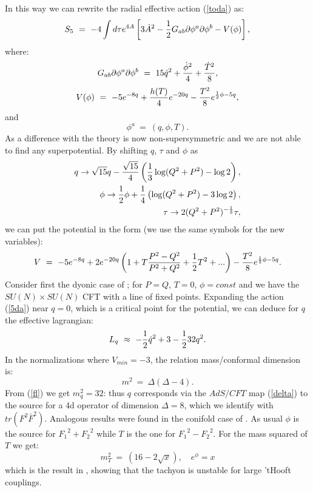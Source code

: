 \documentclass[a4paper,12pt]{article}
\def\half{{1 \over 2}}
\begin{document}
In this way we can rewrite the radial effective action (\ref{toda}) as:
\begin{equation}
S_5~=~-4 \int d\tau e^{4A}\left[3{\dot A}^2 -\half G_{ab}\partial\phi^a\partial\phi^b - V(\phi)\right],
\label{5da}
\end{equation}
where:
\begin{equation}
G_{ab}\partial\phi^a\partial\phi^b~=~15{\dot q}^2 +{{\dot\phi}^2\over4}+{{\dot T}^2\over 8},
\end{equation}
\begin{equation}
V(\phi)~=~-5e^{-8q}+{h(T)\over 4}e^{-20q}- {T^2\over 8}e^{\half \phi -5q},
\end{equation}
and
\begin{equation}
\phi^a~=~(q,\phi,T).
\end{equation}
As a difference with \cite{ktfrac} the theory is now non-supersymmetric and we are not 
able to find any superpotential. By shifting $q$, $\tau$ and $\phi$ as
\begin{eqnarray}
q\rightarrow {\sqrt{15}}q - {{\sqrt{15}}\over4}\left({1\over3}\log(Q^2+P^2) -\log2\right), \nonumber \\
\phi\rightarrow \half\phi + {1\over4}\left(\log(Q^2+P^2) -3\log2\right), \nonumber \\
\tau\rightarrow 2(Q^2+P^2)^{-{1\over3}}\tau ,
\end{eqnarray}
we can put the potential in the form (we use the same symbols for the 
new variables):
\begin{equation}
V~=~ -5e^{-8q} + 2e^{-20q}\left( 1+ T {{P^2-Q^2}\over P^2 + Q^2} + \half T^2 + ...\right)
- {T^2\over 8}e^{\half \phi -5q}.
\end{equation}
Consider first the dyonic case of \cite{kt1}; for $P=Q$, $T=0$, $\phi=const$ and we have
the $SU(N)\times SU(N)$ CFT with a line of fixed points.
Expanding the action (\ref{5da}) near $q=0$, which is a critical point for the potential,  we can deduce for $q$ the effective lagrangian:
\begin{equation}
L_{q}~\approx~ -\half{\dot q}^2 +3 -{\half 32}{q}^2.
\label{fl}
\end{equation}
In the normalizations where $V_{min}=-3$, the relation mass/conformal dimension is:
\begin{equation}
m^2~=~\Delta(\Delta - 4).
\label{delta}
\end{equation}
From (\ref{fl}) we get $m_{q}^2=32$: thus $q$ corresponds via the $AdS/CFT$ map (\ref{delta}) to the source for a 4d operator of dimension $\Delta=8$, which we 
identify with $tr(F^2\bar F^2)$. Analogous results were found in the conifold case of \cite{bgz}.
As usual \cite{k} $\phi$ is the source for ${F_1}^2 + {F_2}^2$ while $T$ 
is the one for ${F_1}^2 - {F_2}^2$. For the mass squared of $T$ we get:
\begin{equation}
m^2_T~=~ (16 -2{\sqrt x}),\quad  e^\phi= x
\end{equation}
which is the result in \cite{k}, showing that the tachyon is unstable for large
'tHooft couplings.
\end{document}

